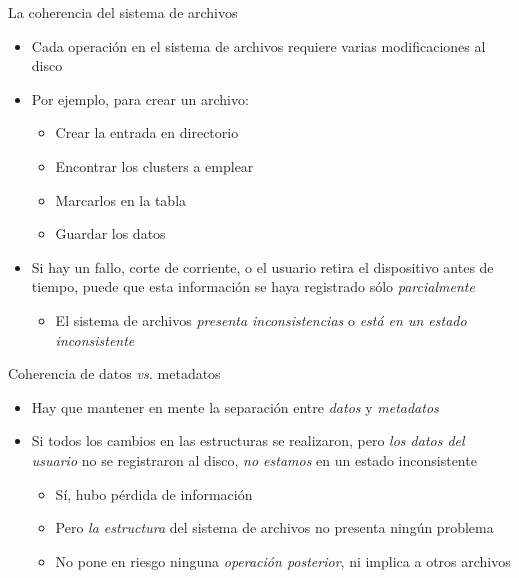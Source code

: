 \documentclass[presentation]{beamer}
\begin{document}
\begin{frame}[label={sec:orgf74da20}]{La coherencia del sistema de archivos}
\begin{itemize}
\item Cada operación en el sistema de archivos requiere varias
modificaciones al disco
\item Por ejemplo, para crear un archivo:
\begin{itemize}
\item Crear la entrada en directorio
\item Encontrar los clusters a emplear
\item Marcarlos en la tabla
\item Guardar los datos
\end{itemize}
\item Si hay un fallo, corte de corriente, o el usuario retira el
dispositivo antes de tiempo, puede que esta información se haya
registrado sólo \emph{parcialmente}
\begin{itemize}
\item El sistema de archivos \emph{presenta inconsistencias} o \emph{está en un
estado inconsistente}
\end{itemize}
\end{itemize}
\end{frame}

\begin{frame}[label={sec:org7d2b823}]{Coherencia de datos \emph{vs.} metadatos}
\begin{itemize}
\item Hay que mantener en mente la separación entre \emph{datos} y \emph{metadatos}
\item Si todos los cambios en las estructuras se realizaron, pero \emph{los
datos del usuario} no se registraron al disco, \emph{no estamos} en un
estado inconsistente
\begin{itemize}
\item Sí, hubo pérdida de información
\item Pero \emph{la estructura} del sistema de archivos no presenta ningún problema
\item No pone en riesgo ninguna \emph{operación posterior}, ni implica a
otros archivos
\end{itemize}
\end{itemize}
\end{frame}
\end{document}
